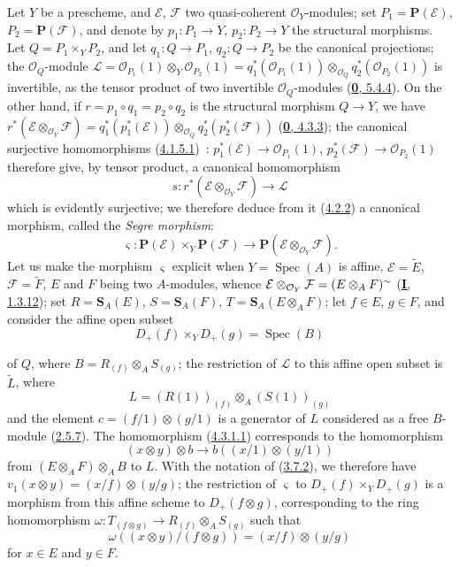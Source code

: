\begin{env}[4.3.1]
\label{II.4.3.1}
Let $Y$ be a prescheme, and $\mathcal{E}$, $\mathcal{F}$ two quasi-coherent
$\mathcal{O}_Y$-modules; set
$P_1=\mathbf{P}(\mathcal{E})$, $P_2=\mathbf{P}(\mathcal{F})$, and denote
by $p_1:P_1\to Y$, $p_2:P_2\to Y$ the structural morphisms. Let
$Q=P_1\times_YP_2$, and let $q_1:Q\to P_1$, $q_2:Q\to P_2$ be the
canonical projections; the $\mathcal{O}_Q$-module $\mathcal{L}=\mathcal{O}_{P_1}(1)\otimes_Y\mathcal{O}_{P_2}(1)
=q_1^*(\mathcal{O}_{P_1}(1))\otimes_{\mathcal{O}_Q}
q_2^*(\mathcal{O}_{P_2}(1))$
is invertible, as the tensor product of two invertible
$\mathcal{O}_Q$-modules (\hyperref[0.5.4.4]{\textbf{0}, 5.4.4}). On the other hand, if
$r=p_1\circ q_1=p_2\circ q_2$ is the structural morphism $Q\to Y$, we have $r^*(\mathcal{E}\otimes_{\mathcal{O}_Y}\mathcal{F})
=q_1^*(p_1^*(\mathcal{E}))\otimes_{\mathcal{O}_Q}
q_2^*(p_2^*(\mathcal{F}))$
(\hyperref[0.4.3.3]{\textbf{0}, 4.3.3}); the canonical surjective homomorphisms
(\hyperref[II.4.1.5.1]{4.1.5.1})~:
$p_1^*(\mathcal{E})\to\mathcal{O}_{P_1}(1)$,
$p_2^*(\mathcal{F})\to\mathcal{O}_{P_2}(1)$ therefore give, by tensor
product, a canonical homomorphism
\[
\label{II.4.3.1.1}
  s:r^*(\mathcal{E}\otimes_{\mathcal{O}_Y}\mathcal{F})\longrightarrow
  \mathcal{L}
\tag{4.3.1.1}
\]
which is evidently surjective; we therefore deduce from it
(\hyperref[II.4.2.2]{4.2.2}) a canonical morphism, called the
\emph{Segre morphism}:
\[
\label{II.4.3.1.2}
  \varsigma:\mathbf{P}(\mathcal{E})\times_Y\mathbf{P}(\mathcal{F})
  \longrightarrow
  \mathbf{P}(\mathcal{E}\otimes_{\mathcal{O}_Y}\mathcal{F}).
\tag{4.3.1.2}
\]
Let us make the morphism $\varsigma$ explicit when $Y=\operatorname{Spec}(A)$ is
affine, $\mathcal{E}=\widetilde{E}$, $\mathcal{F}=\widetilde{F}$, $E$ and $F$
being two $A$-modules, whence
$\mathcal{E}\otimes_{\mathcal{O}_Y}\mathcal{F}=(E\otimes_A F)^{\sim}$
(\hyperref[I.1.3.12]{\textbf{I}, 1.3.12}); set
$R=\mathbf{S}_A(E)$, $S=\mathbf{S}_A(F)$,
$T=\mathbf{S}_A(E\otimes_A F)$; let $f\in E$, $g\in F$, and consider
the affine open subset
\[
  D_+(f)\times_YD_+(g)=\operatorname{Spec}(B)
\]


of $Q$, where $B=R_{(f)}\otimes_AS_{(g)}$; the restriction of $\mathcal{L}$ to
this affine open subset is $\widetilde{L}$, where
\[
  L=(R(1))_{(f)}\otimes_A(S(1))_{(g)}
\]
and the element $c=(f/1)\otimes(g/1)$ is a generator of $L$ considered as a
free $B$-module (\hyperref[II.2.5.7]{2.5.7}). The homomorphism
(\hyperref[II.4.3.1.1]{4.3.1.1}) corresponds to the homomorphism
\[
  (x\otimes y)\otimes b\to b((x/1)\otimes(y/1))
\]
from $(E\otimes_A F)\otimes_AB$ to $L$. With the notation of
(\hyperref[II.3.7.2]{3.7.2}), we therefore have
$v_1(x\otimes y)=(x/f)\otimes(y/g)$; the restriction of $\varsigma$ to
$D_+(f)\times_YD_+(g)$ is a morphism from this affine scheme to
$D_+(f\otimes g)$, corresponding to the ring homomorphism
$\omega:T_{(f\otimes g)}\to R_{(f)}\otimes_AS_{(g)}$ such that
\[
\label{II.4.3.1.3}
  \omega((x\otimes y)/(f\otimes g))=(x/f)\otimes(y/g)
\tag{4.3.1.3}
\]
for $x\in E$ and $y\in F$.
\end{env}

